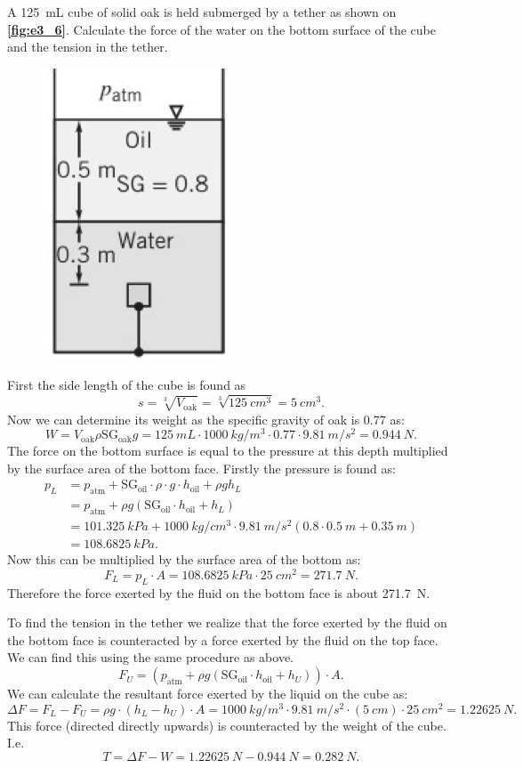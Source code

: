 A \qty{125}{mL} cube of solid oak is held submerged by a tether as shown on \textbf{\autoref{fig:e3_6}}. Calculate the force of the water on the bottom surface of the cube and the tension in the tether.

\begin{figure} [ht]
  \centering
  \includegraphics[width=0.25\linewidth]{./figures/e3_6.png}
  \caption{}
  \label{fig:e3_6}
\end{figure}
\bigbreak
First the side length of the cube is found as
\[ 
  s = \sqrt[3]{V_{\mathrm{oak}}} = \sqrt[3]{\qty{125}{cm^3}} = \qty{5}{cm^3} 
.\]
Now we can determine its weight as the specific gravity of oak is \num{0,77} as:
\[ 
W = V_{\mathrm{oak}} \rho \mathrm{SG}_{\mathrm{oak}} g = \qty{125}{mL} \cdot \qty{1000}{kg/m^3} \cdot \num{0,77} \cdot \qty{9,81}{m/s^2} = \qty{0,944}{N} 
.\]
The force on the bottom surface is equal to the pressure at this depth multiplied by the surface area of the bottom face. Firstly the pressure is found as:
\begin{align*}
  p_L &= p_{\mathrm{atm}} + \mathrm{SG}_{\mathrm{oil}} \cdot \rho \cdot g \cdot h_{\mathrm{oil}} + \rho g h_L \\
  &= p_{\mathrm{atm}} + \rho g \left( \mathrm{SG}_{\mathrm{oil}} \cdot h_{\mathrm{oil}} + h_L \right) \\
  &= \qty{101,325}{kPa} + \qty{1000}{kg/cm^3} \cdot \qty{9,81}{m/s^2} \left( \num{0,8} \cdot \qty{0,5}{m} + \qty{0,35}{m}  \right) \\
  &= \qty{108,6825}{kPa}  
.\end{align*}
Now this can be multiplied by the surface area of the bottom as:
\[ 
F_L = p_L \cdot A = \qty{108,6825}{kPa} \cdot \qty{25}{cm^2}  = \qty{271,7}{N} 
.\]
Therefore the force exerted by the fluid on the bottom face is about \qty{271,7}{N}.

To find the tension in the tether we realize that the force exerted by the fluid on the bottom face is counteracted by a force exerted by the fluid on the top face. We can find this using the same procedure as above.
\[ 
  F_U = \left( p_{\mathrm{atm}} + \rho g \left( \mathrm{SG}_{\mathrm{oil}} \cdot h_{\mathrm{oil}} + h_U \right) \right) \cdot A
.\]
We can calculate the resultant force exerted by the liquid on the cube as:
\[ 
\Delta F = F_L - F_U = \rho g \cdot \left( h_L - h_U \right) \cdot A = \qty{1000}{kg/m^3} \cdot \qty{9.81}{m/s^2} \cdot \left( \qty{5}{cm}  \right) \cdot \qty{25}{cm^2} = \qty{1,22625}{N}
.\]
This force (directed directly upwards) is counteracted by the weight of the cube. I.e.
\[ 
T = \Delta F - W = \qty{1,22625}{N} -\qty{0,944}{N} = \qty{0,282}{N} 
.\]



